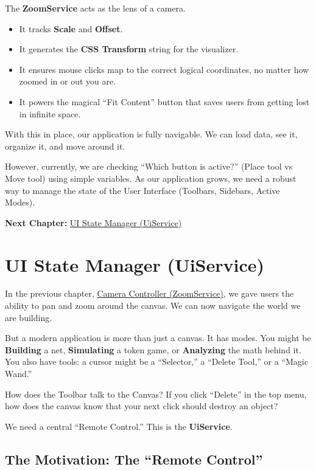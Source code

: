 \documentclass[a4paper,11pt,oneside]{report}
\begin{document}
The \textbf{ZoomService} acts as the lens of a camera.
\begin{itemize}
    \item It tracks \textbf{Scale} and \textbf{Offset}.
    \item It generates the \textbf{CSS Transform} string for the visualizer.
    \item It ensures mouse clicks map to the correct logical coordinates, no matter how zoomed in or out you are.
    \item It powers the magical ``Fit Content'' button that saves users from getting lost in infinite space.
\end{itemize}

With this in place, our application is fully navigable. We can load data, see it, organize it, and move around it.

However, currently, we are checking ``Which button is active?'' (Place tool vs Move tool) using simple variables. As our application grows, we need a robust way to manage the state of the User Interface (Toolbars, Sidebars, Active Modes).

\textbf{Next Chapter:} \hyperref[chap:uiservice]{UI State Manager (UiService)}

\chapter{UI State Manager (UiService)}
\label{chap:uiservice}

In the previous chapter, \hyperref[chap:zoom]{Camera Controller (ZoomService)}, we gave users the ability to pan and zoom around the canvas. We can now navigate the world we are building.

But a modern application is more than just a canvas. It has modes. You might be \textbf{Building} a net, \textbf{Simulating} a token game, or \textbf{Analyzing} the math behind it. You also have tools: a cursor might be a ``Selector,'' a ``Delete Tool,'' or a ``Magic Wand.''

How does the Toolbar talk to the Canvas? If you click ``Delete'' in the top menu, how does the canvas know that your next click should destroy an object?

We need a central ``Remote Control.'' This is the \textbf{UiService}.

\section{The Motivation: The ``Remote Control''}
\end{document}
